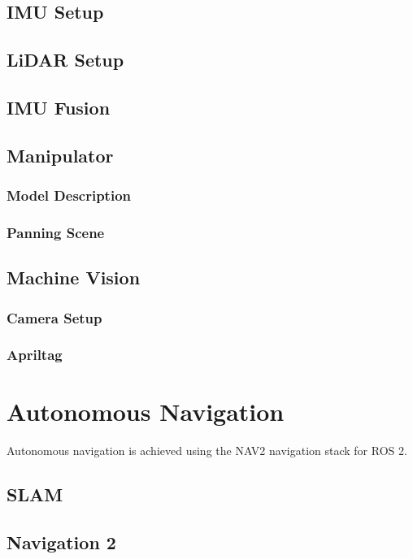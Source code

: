 \subsection{IMU Setup}

\subsection{LiDAR Setup}

\subsection{IMU Fusion}

\subsection{Manipulator}
\subsubsection{Model Description}
\subsubsection{Panning Scene}

\subsection{Machine Vision}
\subsubsection{Camera Setup}
\subsubsection{Apriltag}


\section{Autonomous Navigation}
Autonomous navigation is achieved using the NAV2 navigation stack for ROS 2.

\subsection{SLAM}

\subsection{Navigation 2}



